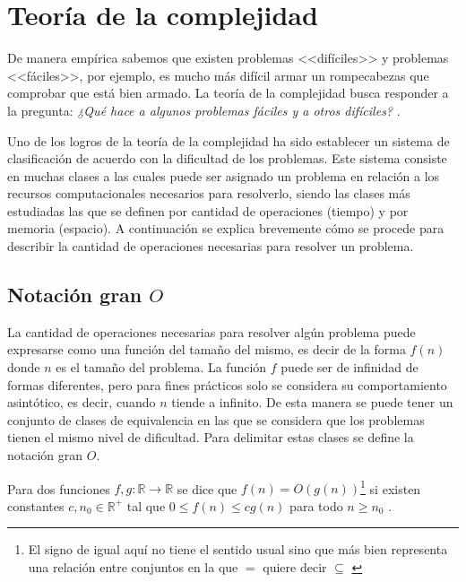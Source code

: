 \section{Teoría de la complejidad}
De manera empírica sabemos que existen problemas <<difíciles>> y problemas <<fáciles>>, por ejemplo, es mucho más difícil armar un rompecabezas que comprobar que está bien armado. La teoría de la complejidad busca responder a la pregunta: \textit{¿Qué hace a algunos problemas fáciles y a otros difíciles?} \cite{sipser1996introduction}. 

Uno de los logros de la teoría de la complejidad ha sido establecer un sistema de clasificación de acuerdo con la dificultad de los problemas. Este sistema consiste en muchas clases a las cuales puede ser asignado un problema en relación a los recursos computacionales necesarios para resolverlo, siendo las clases más estudiadas las que se definen por cantidad de operaciones (tiempo) y por memoria (espacio). 
A continuación se explica brevemente cómo se procede para describir la cantidad de operaciones necesarias para resolver un problema.

\subsection*{Notación gran $O$}
La cantidad de operaciones necesarias para resolver algún problema puede expresarse como una función del tamaño del mismo, es decir de la forma $f(n)$ donde $n$ es el tamaño del problema. La función $f$ puede ser de infinidad de formas diferentes, pero para fines prácticos solo se considera su comportamiento asintótico, es decir, cuando $n$ tiende a infinito. De esta manera se puede tener un conjunto de clases de equivalencia en las que se considera que los problemas tienen el mismo nivel de dificultad. Para delimitar estas clases se define la notación gran $O$.

Para dos funciones $f,g:\mathbb{R}\rightarrow\mathbb{R}$ se dice que $f(n)= O(g(n))$\footnote{El signo de igual aquí no tiene el sentido usual sino que más bien representa una relación entre conjuntos en la que $=$ quiere decir $\subseteq$ \cite{graham1989concrete}} si existen constantes $c,n_0\in\mathbb{R}^+$ tal que $0\leq f(n)\leq cg(n)$ para todo $n\geq n_0$ \cite{cormen2009introduction}.

